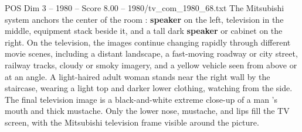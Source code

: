 \begin{textsample}{POS Dim 3 – 1980 – Score 8.00 – 1980/tv\_com\_1980\_68.txt}
The Mitsubishi system anchors the center of the room : \textbf{speaker} on the left, television in the middle, equipment stack beside it, and a tall dark \textbf{speaker} or cabinet on the right.
On the television, the images continue changing rapidly through different movie scenes, including a distant landscape, a fast-moving roadway or city street, railway tracks, cloudy or smoky imagery, and a yellow vehicle seen from above or at an angle.
A light-haired adult woman stands near the right wall by the staircase, wearing a light top and darker lower clothing, watching from the side.
The final television image is a black-and-white extreme close-up of a man ’s mouth and thick mustache.
Only the lower nose, mustache, and lips fill the TV screen, with the Mitsubishi television frame visible around the picture.

\end{textsample}
